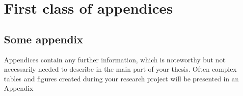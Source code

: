 \chapter*{First class of appendices}
\section{Some appendix}

Appendices contain any further information, which is noteworthy but not necessarily needed to describe in the main part of your thesis. Often complex tables and figures created during your research project will be presented in an Appendix
